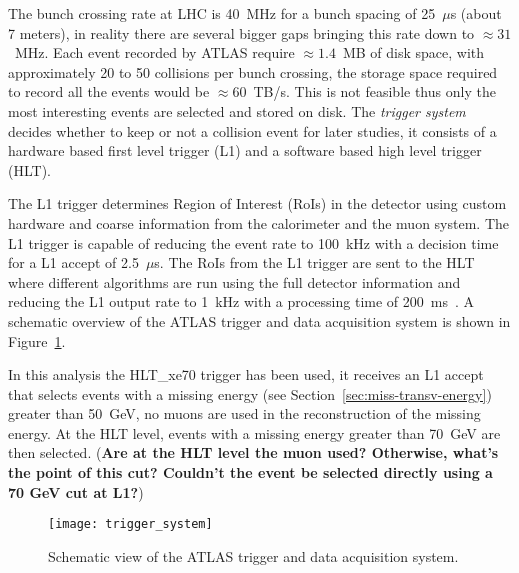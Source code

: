 The bunch crossing rate at LHC is 40~MHz for a bunch spacing of 25~$\mu$s (about
7 meters), in reality there are several bigger gaps bringing this rate down to
$\approx 31$~MHz. Each event recorded by ATLAS require $\approx 1.4$~MB of disk
space, with approximately 20 to 50 collisions per bunch crossing, the storage
space required to record all the events would be $\approx 60$~TB/s. This is not
feasible thus only the most interesting events are selected and stored on
disk. The \emph{trigger system} decides whether to keep or not a collision event
for later studies, it consists of a hardware based first level trigger (L1) and
a software based high level trigger (HLT).

The L1 trigger determines Region of Interest (RoIs) in the detector using custom
hardware and coarse information from the calorimeter and the muon system. The L1
trigger is capable of reducing the event rate to 100~kHz with a decision time
for a L1 accept of 2.5~$\mu$s. The RoIs from the L1 trigger are sent to the HLT
where different algorithms are run using the full detector information and
reducing the L1 output rate to 1~kHz with a processing time of
200~ms~\cite{trigger}. A schematic overview of the ATLAS trigger and data
acquisition system is shown in Figure~\ref{fig:trigger_system}.

In this analysis the HLT\_xe70 trigger has been used, it receives an L1 accept
that selects events with a missing energy (see
Section~\ref{sec:miss-transv-energy}) greater than 50~GeV, no muons are used in
the reconstruction of the missing energy. At the HLT level, events with a
missing energy greater than 70~GeV are then selected. (\textbf{Are at the HLT
  level the muon used? Otherwise, what's the point of this cut? Couldn't the
  event be selected directly using a 70 GeV cut at L1?})

\begin{figure}[!h]
  \centering
    \texttt{[image: trigger\_system]}
    \caption{Schematic view of the ATLAS trigger and data acquisition system.}
    \label{fig:trigger_system}
\end{figure}

